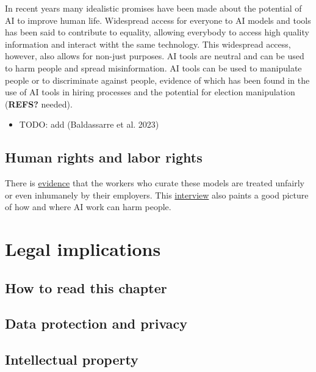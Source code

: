 \documentclass[
  letterpaper,
  DIV=11,
  numbers=noendperiod]{scrreprt}
\providecommand{\tightlist}{%
  \setlength{\itemsep}{0pt}\setlength{\parskip}{0pt}}\usepackage{longtable,booktabs,array}
\begin{document}
In recent years many idealistic promises have been made about the
potential of AI to improve human life. Widespread access for everyone to
AI models and tools has been said to contribute to equality, allowing
everybody to access high quality information and interact witht the same
technology. This widespread access, however, also allows for non-just
purposes. AI tools are neutral and can be used to harm people and spread
misinformation. AI tools can be used to manipulate people or to
discriminate against people, evidence of which has been found in the use
of AI tools in hiring processes and the potential for election
manipulation (\textbf{REFS?} needed).

\begin{itemize}
\tightlist
\item
  TODO: add (Baldassarre et al. 2023)
\end{itemize}

\section{Human rights and labor
rights}\label{human-rights-and-labor-rights}

There is
\href{https://time.com/6247678/openai-chatgpt-kenya-workers/}{evidence}
that the workers who curate these models are treated unfairly or even
inhumanely by their employers. This
\href{https://blogs.lse.ac.uk/businessreview/2024/03/25/madhumita-murgia-ai-can-do-harm-when-people-dont-have-a-voice/}{interview}
also paints a good picture of how and where AI work can harm people.


\chapter{Legal implications}\label{sec-legal}

\section{How to read this chapter}\label{how-to-read-this-chapter}

\section{Data protection and privacy}\label{data-protection-and-privacy}

\section{Intellectual property}\label{intellectual-property}
\end{document}
